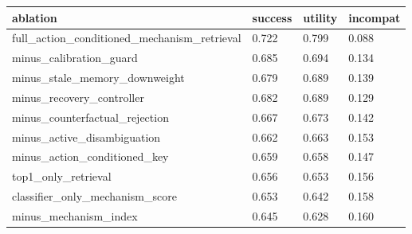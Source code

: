\begin{tabular}{llll}
\toprule
ablation & success & utility & incompat \\
\midrule
full\_action\_conditioned\_mechanism\_retrieval & 0.722 & 0.799 & 0.088 \\
minus\_calibration\_guard & 0.685 & 0.694 & 0.134 \\
minus\_stale\_memory\_downweight & 0.679 & 0.689 & 0.139 \\
minus\_recovery\_controller & 0.682 & 0.689 & 0.129 \\
minus\_counterfactual\_rejection & 0.667 & 0.673 & 0.142 \\
minus\_active\_disambiguation & 0.662 & 0.663 & 0.153 \\
minus\_action\_conditioned\_key & 0.659 & 0.658 & 0.147 \\
top1\_only\_retrieval & 0.656 & 0.653 & 0.156 \\
classifier\_only\_mechanism\_score & 0.653 & 0.642 & 0.158 \\
minus\_mechanism\_index & 0.645 & 0.628 & 0.160 \\
\bottomrule
\end{tabular}

